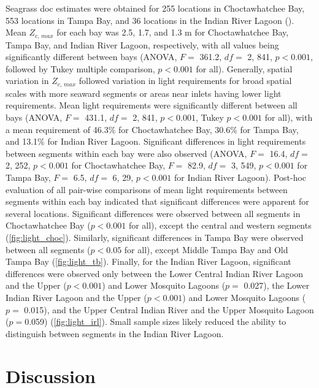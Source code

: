 \documentclass[letterpaper,12pt,oneside]{article}\usepackage[]{graphicx}\usepackage[]{color}
\begin{document}
Seagrass \ac{doc} estimates were obtained for 255 locations in Choctawhatchee Bay, 553 locations in Tampa Bay, and 36 locations in the Indian River Lagoon ().  Mean $Z_{c,\,max}$ for each bay was 2.5, 1.7, and 1.3 m for Choctawhatchee Bay, Tampa Bay, and Indian River Lagoon, respectively, with all values being significantly different between bays (ANOVA, $F=$ 361.2, $df =$ 2, 841, $p < 0.001$, followed by Tukey multiple comparison, $p<0.001$ for all).  Generally, spatial variation in $Z_{c,\,max}$ followed variation in light requirements for broad spatial scales with more seaward segments or areas near inlets having lower light requirements.  Mean light requirements were significantly different between all bays (ANOVA, $F=$ 431.1, $df =$ 2, 841, $p < 0.001$, Tukey $p<0.001$ for all), with a mean requirement of 46.3\% for Choctawhatchee Bay, 30.6\% for Tampa Bay, and 13.1\% for Indian River Lagoon.  Significant differences in light requirements between segments within each bay were also observed (ANOVA, $F =$ 16.4, $df =$ 2, 252, $p < 0.001$ for Choctawhatchee Bay, $F =$ 82.9, $df =$ 3, 549, $p < 0.001$ for Tampa Bay, $F =$ 6.5, $df =$ 6, 29, $p < 0.001$ for Indian River Lagoon).  Post-hoc evaluation of all pair-wise comparisons of mean light requirements between segments within each bay indicated that significant differences were apparent for several locations.  Significant differences were observed between all segments in Choctawhatchee Bay ($p<0.001$ for all), except the central and western segments (\cref{fig:light_choc}).  Similarly, significant differences in Tampa Bay were observed between all segments ($p<0.05$ for all), except Middle Tampa Bay and Old Tampa Bay (\cref{fig:light_tb}).  Finally, for the Indian River Lagoon, significant differences were observed only between the Lower Central Indian River Lagoon and the Upper ($p<0.001$) and Lower Mosquito Lagoons ($p = $ 0.027),  the Lower Indian River Lagoon and the Upper ($p<0.001$) and Lower Mosquito Lagoons ($p = $ 0.015), and the Upper Central Indian River and the Upper Mosquito Lagoon ($p = $0.059) (\cref{fig:light_irl}).  Small sample sizes likely reduced the ability to distinguish between segments in the Indian River Lagoon.

\section{Discussion}
\end{document}
